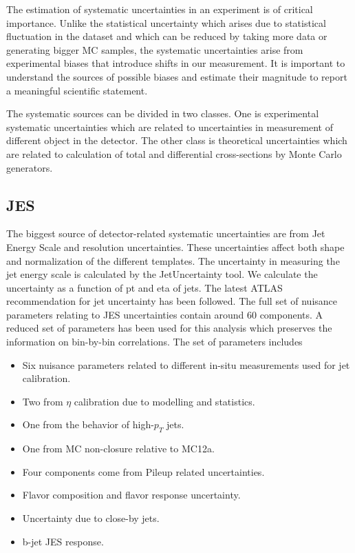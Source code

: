 The estimation of systematic uncertainties in an experiment is of critical importance. Unlike the statistical uncertainty which arises due to statistical fluctuation in the dataset and which can be reduced by taking more data or generating bigger MC samples, the systematic uncertainties arise from experimental biases that introduce shifts in our measurement. It is important to understand the sources of possible biases and estimate their magnitude to report a meaningful scientific statement. 

The systematic sources can be divided in two classes. One is experimental systematic uncertainties which are related to uncertainties in measurement of different object in the detector. The other class is theoretical uncertainties which are related to calculation of total and differential cross-sections by Monte Carlo generators. 
\subsection{JES}
The biggest source of detector-related systematic uncertainties are from Jet Energy Scale and resolution uncertainties. These uncertainties affect both shape and normalization of the different templates. The uncertainty in measuring the jet energy scale is calculated by the JetUncertainty tool. We calculate the uncertainty as a function of pt and eta of jets. The latest ATLAS recommendation for jet uncertainty has been followed. The full set of nuisance parameters relating to JES uncertainties contain around 60 components. A reduced set of parameters has been used for this analysis which preserves the information on bin-by-bin correlations. The set of parameters includes
\begin{itemize}
\item Six nuisance parameters related to different in-situ measurements used for jet calibration.
\item Two from $\eta$ calibration due to modelling and statistics.
\item One from the behavior of high-$p_{T}$ jets.
\item One from MC non-closure relative to MC12a.
\item Four components come from Pileup related uncertainties.
\item Flavor composition and flavor response uncertainty.
\item Uncertainty due to close-by jets.
\item b-jet JES response.
\end{itemize} 

